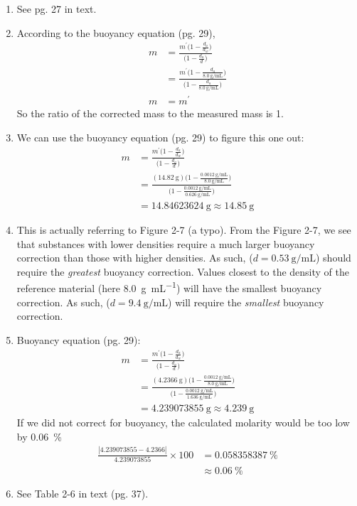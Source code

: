 \documentclass{article}
\begin{document}
\begin{enumerate}[start=6,leftmargin=0pt]
	\item See pg. 27 in text.
	\item According to the buoyancy equation (pg. 29),
		\begin{align*}
			m &= \frac{m^{\prime} \bigg(1 -
					\frac{d_a}{d_w}\bigg)}{\bigg(1 -
			\frac{d_a}{d}\bigg)} \\
			&= \frac{m^{\prime} \bigg(1 -
					\frac{d_a}{\SI{8.0}{\gram\per\milli\liter}}\bigg)}{\bigg(1
			- \frac{d_a}{\SI{8.0}{\gram\per\milli\liter}}\bigg)} \\
			m &= m^\prime
		\end{align*}
		So the ratio of the corrected mass to the measured mass is 1.
	\item We can use the buoyancy equation (pg. 29) to figure this one out:
		\begin{align*}
			m &= \frac{m^{\prime} \bigg(1 -
					\frac{d_a}{d_w}\bigg)}{\bigg(1 -
			\frac{d_a}{d}\bigg)} \\
			&= \frac{(\SI{14.82}{\gram})\bigg(1 -
					\frac{\SI{0.0012}{\gram\per\milli\liter}}{\SI{8.0}{\gram\per\milli\liter}}\bigg)}{\bigg(1
					-
			\frac{\SI{0.0012}{\gram\per\milli\liter}}{\SI{0.626}{\gram\per\milli\liter}}\bigg)}
			\\
			&= \SI{14.84623624}{\gram} \approx \boxed{\SI{14.85}{\gram}}
		\end{align*}
	\item This is actually referring to Figure 2-7 (a typo). From the
		Figure 2-7, we see that substances with lower densities require
		a much larger buoyancy correction than those with higher
		densities. As such,  ($d =
		\SI{0.53}{\gram\per\milli\liter}$) should require the \emph{greatest}
		buoyancy correction. Values closest to the density of the
		reference material (here \SI{8.0}{\gram\per\milli\liter}) will
		have the smallest buoyancy correction. As such,  ($d =
		\SI{9.4}{\gram\per\milli\liter}$) will require the \emph{smallest}
		buoyancy correction.
	\item Buoyancy equation (pg. 29):
		\begin{align*}
			m &= \frac{m^{\prime} \bigg(1 -
				\frac{d_a}{d_w}\bigg)}{\bigg(1 -
				\frac{d_a}{d}\bigg)} \\
			&= \frac{(\SI{4.2366}{\gram})\bigg(1 -
				\frac{\SI{0.0012}{\gram\per\milli\liter}}{\SI{8.0}{\gram\per\milli\liter}}\bigg)}{\bigg(1
				-
				\frac{\SI{0.0012}{\gram\per\milli\liter}}{\SI{1.636}{\gram\per\milli\liter}}\bigg)}
			\\
			&= \SI{4.239073855}{\gram} \approx \boxed{\SI{4.239}{\gram}}
		\end{align*}
		If we did not correct for buoyancy, the calculated molarity would be too low by \SI{0.06}{\percent}
		\begin{align*}
		\frac{|4.239073855-4.2366|}{4.239073855} \times 100 &= \SI{0.058358387}{\percent} \\
		&\approx \boxed{\SI{0.06}{\percent}}
		\end{align*}
	\item See Table 2-6 in text (pg. 37).
\end{enumerate}
\end{document}
